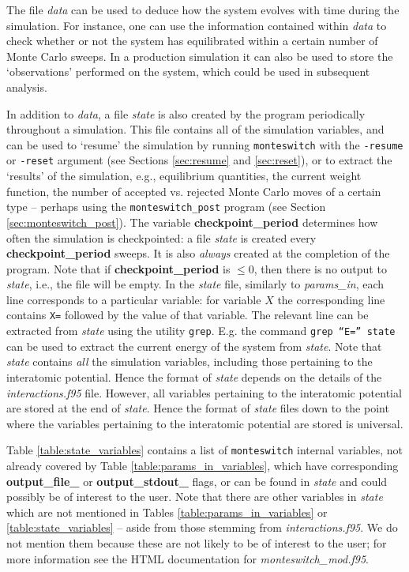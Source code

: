\documentclass{report}
\begin{document}
The file \emph{data} can be used to deduce how the system evolves with time during the simulation. For instance, one can use the information contained 
within \emph{data} to check whether or not the system has equilibrated within a certain number of Monte Carlo sweeps. In a production simulation it
can also be used to store the `observations' performed on the system, which could be used in subsequent analysis.

In addition to \emph{data}, a file \emph{state} is also created by the program periodically throughout a simulation. This file contains all of the 
simulation variables, and can be used to `resume' the simulation by running \texttt{monteswitch} with the \texttt{-resume} or \texttt{-reset} argument
(see Sections \ref{sec:resume} and \ref{sec:reset}), or to extract the `results' of the simulation, e.g., equilibrium quantities, the current weight 
function, the number of accepted vs. rejected Monte Carlo moves of a certain type -- perhaps using the \texttt{monteswitch\_post} program 
(see Section \ref{sec:monteswitch_post}).
The variable \textbf{checkpoint\_period} determines how often the simulation is checkpointed: a file \emph{state} is created every 
\textbf{checkpoint\_period} sweeps. It is also \emph{always} created at the completion of the program. Note that if \textbf{checkpoint\_period} is $\leq 0$, 
then there is no output to \emph{state}, i.e., the file will be empty.
In the \emph{state} file, similarly to \emph{params\_in}, each line corresponds to a particular variable: for variable $X$ the corresponding line contains
\texttt{X=} followed by the value of that variable. The relevant line can be extracted from \emph{state} using the utility \texttt{grep}. E.g. the command
\texttt{grep ``E='' state} can be used to extract the current energy of the system from \emph{state}.
Note that \emph{state} contains \emph{all} the simulation variables, including those
pertaining to the interatomic potential. Hence the format of \emph{state} depends on the details of the \emph{interactions.f95} file. However,
all variables pertaining to the interatomic potential are stored at the end of \emph{state}. Hence the format of \emph{state} files down to the
point where the variables pertaining to the interatomic potential are stored is universal. 

Table \ref{table:state_variables} contains a list of \texttt{monteswitch} internal variables, not already covered by Table \ref{table:params_in_variables},
which have corresponding \textbf{output\_file\_} or \textbf{output\_stdout\_} flags, or can be found in \emph{state} and could possibly be of interest
to the user. Note that there are other variables in \emph{state} which are not mentioned in Tables \ref{table:params_in_variables} or 
\ref{table:state_variables} -- aside from those stemming from \emph{interactions.f95}. We do not mention them because these are not likely to be of
interest to the user; for more information see the HTML documentation for \emph{monteswitch\_mod.f95}.
\end{document}
